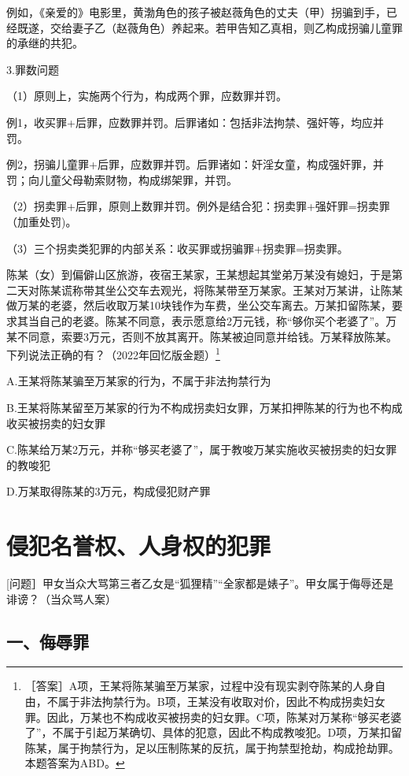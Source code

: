 例如，《亲爱的》电影里，黄渤角色的孩子被赵薇角色的丈夫（甲）拐骗到手，已经既遂，交给妻子乙（赵薇角色）养起来。若甲告知乙真相，则乙构成拐骗儿童罪的承继的共犯。

3.罪数问题

（1）原则上，实施两个行为，构成两个罪，应数罪并罚。

例1，收买罪+后罪，应数罪并罚。后罪诸如：包括非法拘禁、强奸等，均应并罚。

例2，拐骗儿童罪+后罪，应数罪并罚。后罪诸如：奸淫女童，构成强奸罪，并罚；向儿童父母勒索财物，构成绑架罪，并罚。

（2）拐卖罪+后罪，原则上数罪并罚。例外是结合犯：拐卖罪+强奸罪=拐卖罪（加重处罚)。

（3）三个拐卖类犯罪的内部关系：收买罪或拐骗罪+拐卖罪=拐卖罪。


陈某（女）到偏僻山区旅游，夜宿王某家，王某想起其堂弟万某没有媳妇，于是第二天对陈某谎称带其坐公交车去观光，将陈某带至万某家。王某对万某讲，让陈某做万某的老婆，然后收取万某10块钱作为车费，坐公交车离去。万某扣留陈某，要求其当自己的老婆。陈某不同意，表示愿意给2万元钱，称“够你买个老婆了”。万某不同意，索要3万元，否则不放其离开。陈某被迫同意并给钱。万某释放陈某。下列说法正确的有？（2022年回忆版金题）\footnote{［答案］A项，王某将陈某骗至万某家，过程中没有现实剥夺陈某的人身自由，不属于非法拘禁行为。B项，王某没有收取对价，因此不构成拐卖妇女罪。因此，万某也不构成收买被拐卖的妇女罪。C项，陈某对万某称“够买老婆了”，不属于引起万某确切、具体的犯意，因此不构成教唆犯。D项，万某扣留陈某，属于拘禁行为，足以压制陈某的反抗，属于拘禁型抢劫，构成抢劫罪。本题答案为ABD。}

A.王某将陈某骗至万某家的行为，不属于非法拘禁行为

B.王某将陈某留至万某家的行为不构成拐卖妇女罪，万某扣押陈某的行为也不构成收买被拐卖的妇女罪

C.陈某给万某2万元，并称“够买老婆了”，属于教唆万某实施收买被拐卖的妇女罪的教唆犯

D.万某取得陈某的3万元，构成侵犯财产罪

\section{侵犯名誉权、人身权的犯罪}

[问题］甲女当众大骂第三者乙女是“狐狸精”“全家都是婊子”。甲女属于侮辱还是诽谤？（当众骂人案）

\subsection*{一、侮辱罪}

